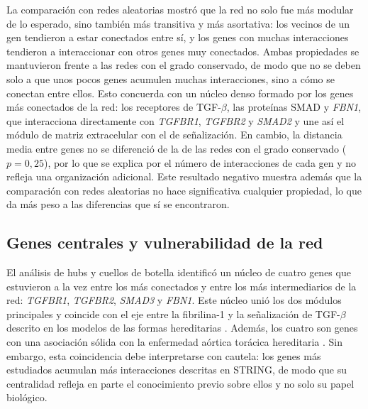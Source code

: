 La comparación con redes aleatorias mostró que la red no solo fue más modular de lo esperado, sino también más transitiva y más asortativa: los vecinos de un gen tendieron a estar conectados entre sí, y los genes con muchas interacciones tendieron a interaccionar con otros genes muy conectados. Ambas propiedades se mantuvieron frente a las redes con el grado conservado, de modo que no se deben solo a que unos pocos genes acumulen muchas interacciones, sino a cómo se conectan entre ellos. Esto concuerda con un núcleo denso formado por los genes más conectados de la red: los receptores de TGF-$\beta$, las proteínas SMAD y \textit{FBN1}, que interacciona directamente con \textit{TGFBR1}, \textit{TGFBR2} y \textit{SMAD2} y une así el módulo de matriz extracelular con el de señalización. En cambio, la distancia media entre genes no se diferenció de la de las redes con el grado conservado ($p = 0{,}25$), por lo que se explica por el número de interacciones de cada gen y no refleja una organización adicional. Este resultado negativo muestra además que la comparación con redes aleatorias no hace significativa cualquier propiedad, lo que da más peso a las diferencias que sí se encontraron.

\subsection{Genes centrales y vulnerabilidad de la red}

El análisis de hubs y cuellos de botella identificó un núcleo de cuatro genes que estuvieron a la vez entre los más conectados y entre los más intermediarios de la red: \textit{TGFBR1}, \textit{TGFBR2}, \textit{SMAD3} y \textit{FBN1}. Este núcleo unió los dos módulos principales y coincide con el eje entre la fibrilina-1 y la señalización de TGF-$\beta$ descrito en los modelos de las formas hereditarias \cite{Lindsay2011}. Además, los cuatro son genes con una asociación sólida con la enfermedad aórtica torácica hereditaria \cite{Pinard2019,Renard2018}. Sin embargo, esta coincidencia debe interpretarse con cautela: los genes más estudiados acumulan más interacciones descritas en STRING, de modo que su centralidad refleja en parte el conocimiento previo sobre ellos y no solo su papel biológico.

